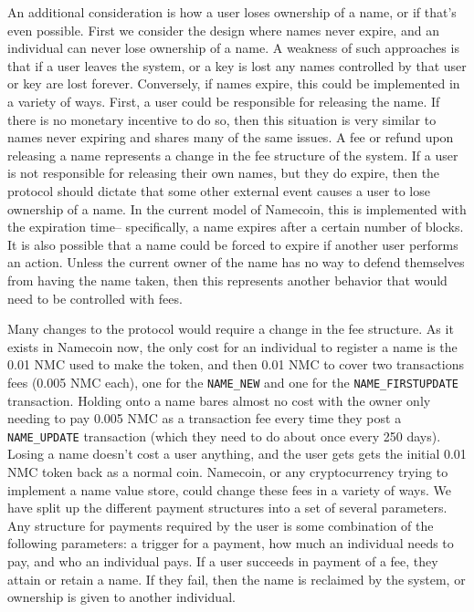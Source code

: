     An additional consideration is how a user loses ownership of a name, or if that's even possible. First we consider the design where names never expire, and an individual can never lose ownership of a name. A weakness of such approaches is that if a user leaves the system, or a key is lost any names controlled by that user or key are lost forever. Conversely, if names expire, this could be implemented in a variety of ways. First, a user could be responsible for releasing the name. If there is no monetary incentive to do so, then this situation is very similar to names never expiring and shares many of the same issues. A fee or refund upon releasing a name represents a change in the fee structure of the system. If a user is not responsible for releasing their own names, but they do expire, then the protocol should dictate that some other external event causes a user to lose ownership of a name. In the current model of Namecoin, this is implemented with the expiration time-- specifically, a name expires after a certain number of blocks. It is also possible that a name could be forced to expire if another user performs an action. Unless the current owner of the name has no way to defend themselves from having the name taken, then this represents another behavior that would need to be controlled with fees. 

    Many changes to the protocol would require a change in the fee structure. As it exists in Namecoin now, the only cost for an individual to register a name is the 0.01 NMC used to make the token, and then 0.01 NMC to cover two transactions fees (0.005 NMC each), one for the {\tt NAME\_NEW} and one for the {\tt NAME\_FIRSTUPDATE} transaction. Holding onto a name bares almost no cost with the owner only needing to pay 0.005 NMC as a transaction fee every time they post a {\tt NAME\_UPDATE} transaction (which they need to do about once every 250 days). Losing a name doesn't cost a user anything, and the user gets gets the initial 0.01 NMC token back as a normal coin. Namecoin, or any cryptocurrency trying to implement a name value store, could change these fees in a variety of ways. We have split up the different payment structures into a set of several parameters. Any structure for payments required by the user is some combination of the following parameters: a trigger for a payment, how much an individual needs to pay, and who an individual pays. If a user succeeds in payment of a fee, they attain or retain a name. If they fail, then the name is reclaimed by the system, or ownership is given to another individual. 

